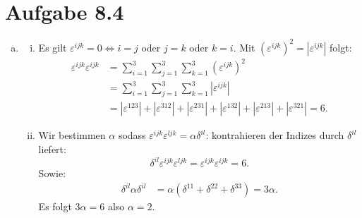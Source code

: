 \documentclass{theozettel}
\renewcommand{\epsilon}{\varepsilon}
\begin{document}
\section*{Aufgabe 8.4}
\begin{enumerate}[(a)]
	\item 	\begin{enumerate}[(i)]
				\item 	Es gilt $\epsilon^{ijk} = 0 \iff i=j$ oder $j=k$ oder $k=i$. Mit $(\epsilon^{ijk})^{2} = |\epsilon^{ijk}|$ folgt:
						\begin{align*}
							\epsilon^{ijk}\epsilon^{ijk} &= \sum_{i=1}^{3}\sum_{j=1}^{3}\sum_{k=1}^{3} (\epsilon^{ijk})^{2} \\
							&= \sum_{i=1}^{3}\sum_{j=1}^{3}\sum_{k=1}^{3} |\epsilon^{ijk}| \\
							&= |\epsilon^{123}| + |\epsilon^{312}| + |\epsilon^{231}| + |\epsilon^{132}| + |\epsilon^{213}| + |\epsilon^{321}| = 6.
						\end{align*}
				
				\item 	Wir bestimmen $\alpha$ sodass $\epsilon^{ijk}\epsilon^{ljk} = \alpha\delta^{il}$: kontrahieren der Indizes durch $\delta^{il}$ liefert:
						\[
							\delta^{il}\epsilon^{ijk}\epsilon^{ljk} = \epsilon^{ijk}\epsilon^{ijk} = 6.
						\]
						Sowie:
						\begin{align*}
							\delta^{il}\alpha \delta^{il} &= \alpha(\delta^{11} + \delta^{22} + \delta^{33}) = 3\alpha.
						\end{align*}
						Es folgt $3 \alpha = 6$ also $\alpha=2$.
				

\end{enumerate}
\end{enumerate}
\end{document}
